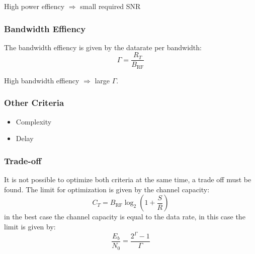 High power effiency $\Rightarrow$ small required SNR

\subsubsection{Bandwidth Effiency}
The bandwidth effiency is given by the datarate per bandwidth:
\begin{equation}
    \Gamma = \frac{R_T}{B_\text{RF}}
\end{equation}

High bandwidth effiency $\Rightarrow$ large $\Gamma$.

\subsubsection{Other Criteria}
\begin{itemize}
    \item Complexity
    \item Delay
\end{itemize}

\subsubsection{Trade-off}
It is not possible to optimize both criteria at the same time, a trade off must be found.
The limit for optimization is given by the channel capacity:
\begin{equation}
    C_T = B_\text{RF} \log_2 \left(1 + \frac{S}{R}\right)
\end{equation}
in the best case the channel capacity is equal to the data rate, in this case the limit
is given by:
\begin{equation}
    \frac{E_b}{N_0} = \frac{2^\Gamma -1}{\Gamma}
\end{equation}
